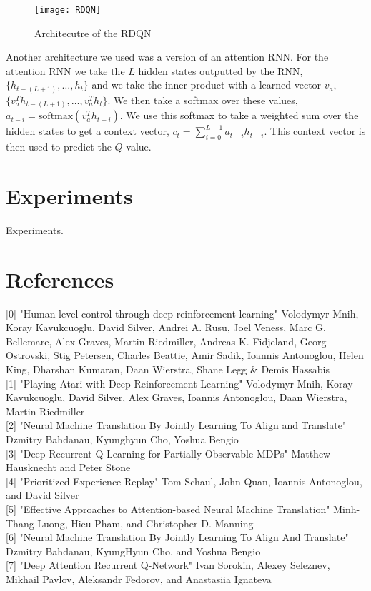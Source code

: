 \documentclass{article}
\begin{document}
\begin{figure}[h]
    \centering
    \texttt{[image: RDQN]}
    \caption{Architecutre of the RDQN}
\end{figure}

Another architecture we used was a version of an attention RNN. For the attention
RNN we take the $L$ hidden states outputted by the RNN, $\{h_{t-(L+1)}, \dots, h_{t}\}$
and we take the inner product with a learned vector $v_a$, $\{v_a^Th_{t-(L+1)}, \dots,
v_a^Th_{t}\}$. We then take a softmax over these values, $a_{t-i} =
\text{softmax}(v_a^Th_{t-i})$. We use this softmax to take a weighted sum over
the hidden states to get a context vector, $c_t = \sum_{i=0}^{L-1}a_{t-i}h_{t-i}$.
This context vector is then used to predict the $Q$ value.

\section{Experiments}
Experiments.

\section*{References}
\small
[0] "Human-level control through deep reinforcement learning" Volodymyr Mnih, Koray Kavukcuoglu, David Silver, Andrei A. Rusu, Joel Veness, Marc G. Bellemare, Alex Graves, Martin Riedmiller, Andreas K. Fidjeland, Georg Ostrovski, Stig Petersen, Charles Beattie, Amir Sadik, Ioannis Antonoglou, Helen King, Dharshan Kumaran, Daan Wierstra, Shane Legg \& Demis Hassabis \\

[1] "Playing Atari with Deep Reinforcement Learning" Volodymyr Mnih, Koray Kavukcuoglu, David Silver, Alex Graves, Ioannis Antonoglou, Daan Wierstra, Martin Riedmiller \\

[2] "Neural Machine Translation By Jointly Learning To Align and Translate" Dzmitry Bahdanau, Kyunghyun Cho, Yoshua Bengio \\

[3] "Deep Recurrent Q-Learning for Partially Observable MDPs" Matthew Hausknecht and Peter Stone \\

[4] "Prioritized Experience Replay" Tom Schaul, John Quan, Ioannis Antonoglou, and David Silver \\

[5] "Effective Approaches to Attention-based Neural Machine Translation" Minh-Thang Luong, Hieu Pham, and Christopher D. Manning \\

[6] "Neural Machine Translation By Jointly Learning To Align And Translate" Dzmitry Bahdanau, KyungHyun Cho, and Yoshua Bengio \\

[7] "Deep Attention Recurrent Q-Network" Ivan Sorokin, Alexey Seleznev, Mikhail Pavlov, Aleksandr Fedorov, and Anastasiia Ignateva \\
\end{document}

